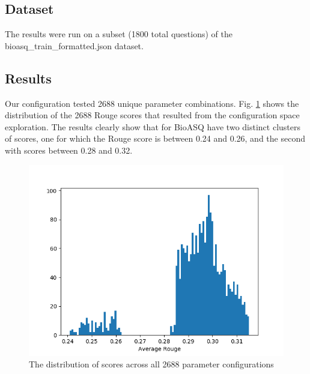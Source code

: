 \documentclass{article}
\begin{document}
    \subsection{Dataset}
    The results were run on a subset (1800 total questions) of the bioasq\_train\_formatted.json dataset.


    \subsection{Results}

    Our configuration tested 2688 unique parameter combinations.
    Fig. \ref{fig:histogram} shows the distribution of the 2688 Rouge scores that resulted from the configuration space exploration.
    The results clearly show that for BioASQ have two distinct clusters of scores, one for which the Rouge score is between 0.24 and 0.26,
    and the second with scores between 0.28 and 0.32.

    \begin{figure}[H]
        \begin{center}
            \includegraphics[width=\textwidth]{fig/hist.png}
        \end{center}
        \caption{The distribution of scores across all 2688 parameter configurations}\label{fig:histogram}
    \end{figure}
\end{document}
